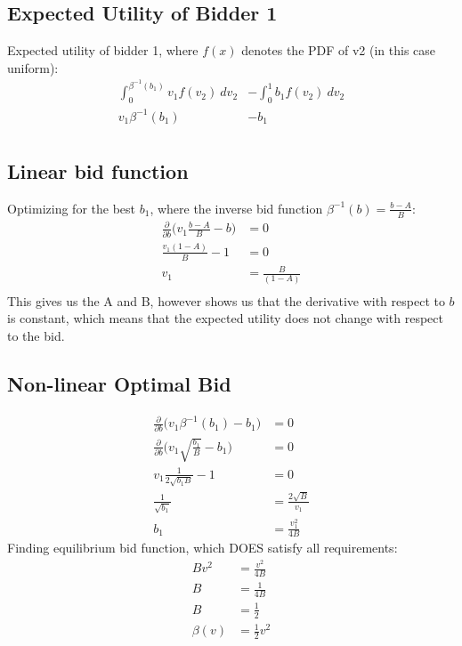 \documentclass[a4paper,12pt]{article}
\begin{document}
\section{}
\subsection{}
\subsection{Expected Utility of Bidder 1}
Expected utility of bidder 1, where $f(x)$ denotes the PDF of v2 (in this case uniform):
\begin{align*}
\int_{0}^{\beta^{-1}(b_1)} v_1 f(v_2) \ dv_2 &- \int_{0}^{1} b_1 f(v_2) \ dv_2 \\
v_1 \beta^{-1}(b_1) &-  b_1 \\
\end{align*}

\subsection{Linear bid function}
Optimizing for the best $b_1$, where the inverse bid function $\beta^{-1}(b) = \frac{b - A}{B}$:
%
\begin{align*}
\frac{\partial}{\partial b} \bigg(v_1 \frac{b - A}{B} - b \bigg) &= 0 \\
\frac{v_1(1 - A)}{B} - 1 &= 0 \\
v_1 &= \frac{B}{(1 - A)} \\
\end{align*} 
%
This gives us the A and B, however shows us that the derivative with respect to $b$ is constant, which means that the expected utility does not change with respect to the bid. 

\subsection{Non-linear Optimal Bid}
\begin{align*}
\frac{\partial}{\partial b} \bigg( v_1 \beta^{-1}(b_1) - b_1 \bigg) &= 0\\
\frac{\partial}{\partial b} \bigg( v_1 \sqrt{\frac{b_1}{B}} - b_1 \bigg) &= 0 \\
v_1 \frac{1}{2 \sqrt{b_1 B}} - 1 &= 0 \\
\frac{1}{\sqrt{b_1}} &= \frac{2 \sqrt{B}}{v_1} \\
b_1 &= \frac{v_1^2}{4B} 
\end{align*}
%
Finding equilibrium bid function, which DOES satisfy all requirements: 
%
\begin{align*}
Bv^2 &= \frac{v^2}{4B} \\
B &= \frac{1}{4B} \\
B &= \frac{1}{2} \\
\beta(v) &= \frac{1}{2}v^2
\end{align*}
\end{document}
